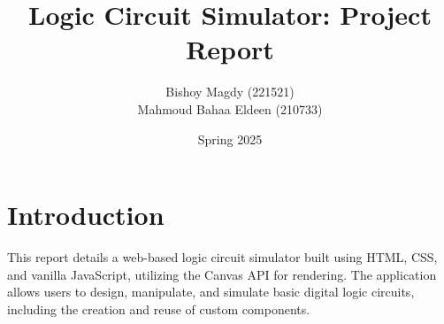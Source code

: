 \documentclass[11pt, a4paper]{article}
\title{Logic Circuit Simulator: Project Report}
\author{
    Bishoy Magdy (221521) \\
    Mahmoud Bahaa Eldeen (210733)
}
\date{Spring 2025}
\newcommand{\course}{Advanced Topics in Computer Engineering (CSE5636/ECE5434)}
\newcommand{\supervisor}{Dr. Ghada Abdelmouez}
\newcommand{\university}{MSA University}
\newcommand{\faculty}{Faculty of Engineering}
\begin{document}

\tableofcontents
\newpage

\section{Introduction}
This report details a web-based logic circuit simulator built using HTML, CSS, and vanilla JavaScript, utilizing the Canvas API for rendering. The application allows users to design, manipulate, and simulate basic digital logic circuits, including the creation and reuse of custom components.

\end{document}
